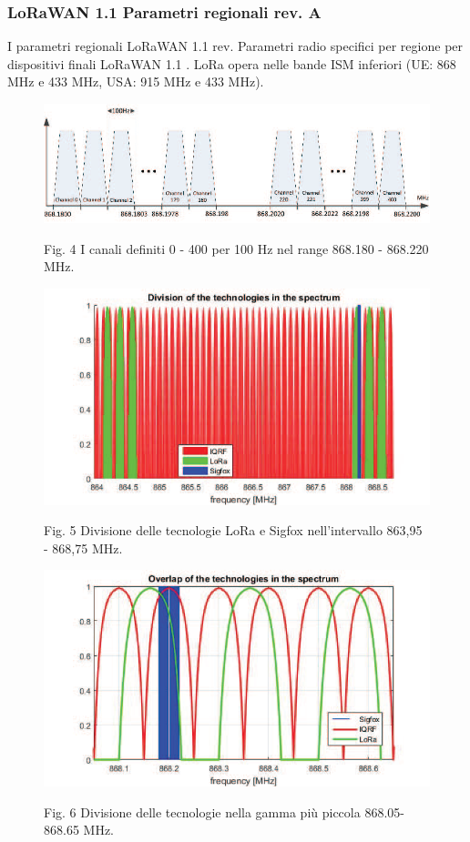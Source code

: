 \documentclass[a4paper]{report} %
\begin{document}
\subsubsection{LoRaWAN 1.1 Parametri regionali rev. A}
I parametri regionali LoRaWAN 1.1 rev. Parametri radio specifici per regione per dispositivi finali LoRaWAN 1.1 \cite{art:rif.29}.
LoRa opera nelle bande ISM inferiori (UE: 868 MHz e 433 MHz, USA: 915 MHz e 433 MHz). 

\begin{figure}
\centering
\includegraphics[scale=.5]{Immagini/DivisioneBande.png}

Fig. 4 I canali definiti 0 - 400 per 100 Hz nel range 868.180 - 868.220 MHz. %
\end{figure}

\begin{figure}
\centering
\includegraphics[scale=.5]{Immagini/DivB.png}

Fig. 5 Divisione delle tecnologie LoRa e Sigfox nell'intervallo 863,95 - 868,75 MHz. %
\end{figure}

\begin{figure}
\centering
\includegraphics[scale=.5]{Immagini/DivisioneBande2.png}

Fig. 6 Divisione delle tecnologie nella gamma più piccola 868.05-868.65 MHz. %
\end{figure}
\end{document}
